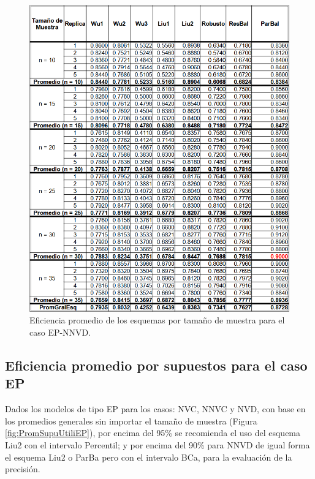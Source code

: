 \begin{figure}[ht] 
	\centering 
	\includegraphics[width=0.70\linewidth]{img/EP_NNVD_Efic_Esq.png} 
	\caption{Eficiencia promedio de los esquemas por tamaño de muestra para el caso EP-NNVD.} 
	\label{fig:EficPromEsqTamMuesEsqRemuEP-NNVD}
\end{figure}
\FloatBarrier



\subsection{Eficiencia promedio por supuestos para el caso EP}
Dados los modelos de tipo EP para los casos: NVC, NNVC y NVD, con base en los promedios generales sin importar el tamaño de muestra (Figura \ref{fig:PromSupuUtiliEP}), por encima del 95\% se recomienda el uso del esquema Liu2 con el intervalo Percentil; y por encima del 90\% para NNVD de igual forma el esquema Liu2 o ParBa pero con el intervalo BCa, para la evaluación de la precisión.


